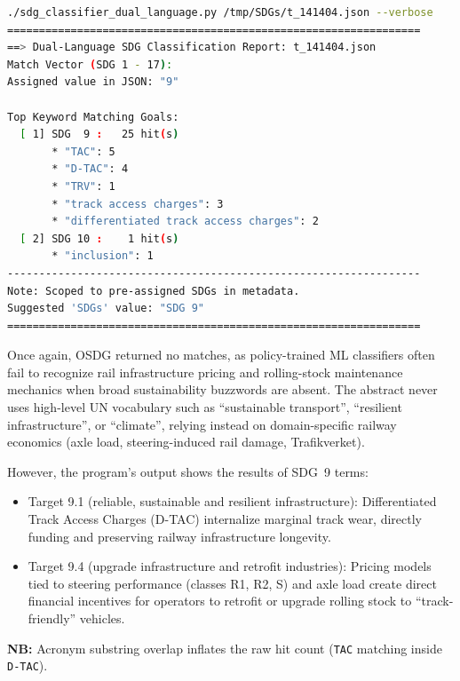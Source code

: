\begin{casestudySection}
\begin{lstlisting}[language={bash}, basicstyle=\footnotesize, escapechar=|, breaklines=true,
    postbreak=\usebox{\lstbreakbox}, caption={Program's output}, label=lst:t_141404Output]
./sdg_classifier_dual_language.py /tmp/SDGs/t_141404.json --verbose
=================================================================
==> Dual-Language SDG Classification Report: t_141404.json
Match Vector (SDG 1 - 17):
Assigned value in JSON: "9"

Top Keyword Matching Goals:
  [ 1] SDG  9 :   25 hit(s)
       * "TAC": 5
       * "D-TAC": 4
       * "TRV": 1
       * "track access charges": 3
       * "differentiated track access charges": 2
  [ 2] SDG 10 :    1 hit(s)
       * "inclusion": 1
-----------------------------------------------------------------
Note: Scoped to pre-assigned SDGs in metadata.
Suggested 'SDGs' value: "SDG 9"
=================================================================
\end{lstlisting}

Once again, OSDG returned no matches, as policy-trained \gls{ML} classifiers often fail to recognize rail infrastructure pricing and rolling-stock maintenance mechanics when broad sustainability buzzwords are absent. The abstract never uses high-level \gls{UN} vocabulary such as \enquote{sustainable transport}, \enquote{resilient infrastructure}, or \enquote{climate}, relying instead on domain-specific railway economics (\eg axle load, steering-induced rail damage, Trafikverket).

However, the program's output shows the results of \gls{SDG}~9 terms:
\begin{itemize}
\item Target 9.1 (reliable, sustainable and resilient infrastructure): Differentiated Track Access Charges (D-TAC) internalize marginal track wear, directly funding and preserving railway infrastructure longevity.

\item Target 9.4 (upgrade infrastructure and retrofit industries): Pricing models tied to steering performance (classes R1, R2, S) and axle load create direct financial incentives for operators to retrofit or upgrade rolling stock to \enquote{track-friendly} vehicles.
\end{itemize}

\textbf{NB:} Acronym substring overlap inflates the raw hit count (\eg \texttt{TAC} matching inside \texttt{D-TAC}).

\end{casestudySection}

